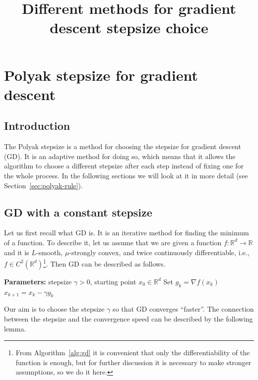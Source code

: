 \documentclass[11pt]{article}
\title{Different methods for gradient descent stepsize choice}
\author{}
\date{}
\newcommand{\R}{\mathbb{R}}
\begin{document}
\maketitle

\section{Polyak stepsize for gradient descent}\label{sec:polyak}

\subsection{Introduction}\label{sec:intro}

The Polyak stepsize is a method for choosing the stepsize for gradient descent (GD).
It is an adaptive method for doing so, which means that it allows the algorithm
to choose a different stepsize after each step instead of fixing one for the whole process.
In the following sections we will look at it in more detail (see Section~\ref{sec:polyak-rule}).


\subsection{GD with a constant stepsize}\label{sec:constant}

Let us first recall what GD is. It is an
iterative method for finding the minimum of a function.
To describe it, let us assume that we are given a function $f\colon \R^d \to \R$ and it is $L$-smooth,
$\mu$-strongly convex, and twice continuously differentiable, i.e., $f \in C^2(\R^d)$\footnote{From
Algorithm~\ref{alg:gd} it is convenient that only the differentiability of the function is enough, but
for further discussion it is necessary to make stronger assumptions, so we do it here.}.
Then GD can be described as follows.

\begin{algorithm}[H]
\caption{GD}\label{alg:gd}
\begin{algorithmic}[1]
\State \textbf{Parameters:} stepsize $\gamma > 0$, starting point $x_0 \in \R^d$
  \State Set $g_k = \nabla f(x_k)$
  \State $x_{k+1} = x_k - \gamma g_k$
\EndFor
\end{algorithmic}
\end{algorithm}

Our aim is to choose the stepsize $\gamma$ so that GD converges ``faster''.
The connection between the stepsize and the convergence speed can be described by the following lemma.
\end{document}
